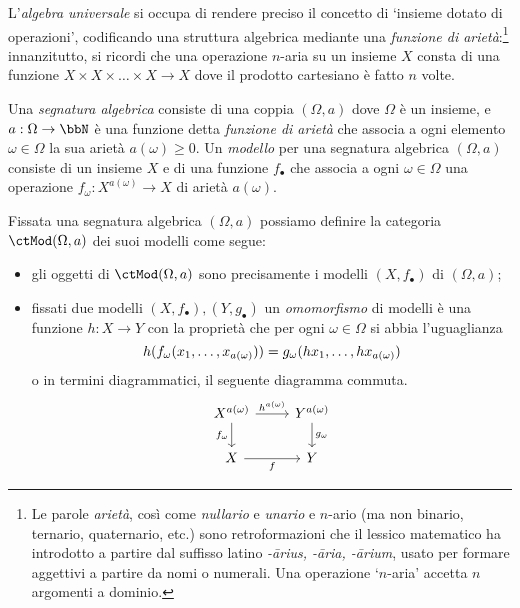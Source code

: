 L'\emph{algebra universale} si occupa di rendere preciso il concetto di `insieme dotato di operazioni', codificando una struttura algebrica mediante una \emph{funzione di arietà}:\footnote{Le parole \emph{arietà}, così come \emph{nullario} e \emph{unario} e \(n\)-ario (ma non binario, ternario, quaternario, etc.) sono retroformazioni che il lessico matematico ha introdotto a partire dal suffisso latino \emph{-\={a}rius, -\=aria, -\=arium}, usato per formare aggettivi a partire da nomi o numerali. Una operazione `\(n\)-aria' accetta \(n\) argomenti a dominio.} innanzitutto, si ricordi che una operazione \(n\)-aria su un insieme \(X\) consta di una funzione \(X\times X\times\dots\times X \to X\) dove il prodotto cartesiano è fatto \(n\) volte.
\begin{example}\label{ex_cat_sigma_strutture}
	Una \emph{segnatura algebrica} consiste di una coppia \((\Omega, a)\) dove \(\Omega\) è un insieme, e \(a : \Omega \to \bbN\) è una funzione detta \emph{funzione di arietà} che associa a ogni elemento \(\omega \in \Omega\) la sua arietà \(a(\omega)\ge 0\). Un \emph{modello} per una segnatura algebrica \((\Omega,a)\) consiste di un insieme \(X\) e di una funzione \(f_\bullet\) che associa a ogni \(\omega\in\Omega\) una operazione \(f_\omega : X^{a(\omega)} \to X\) di arietà \(a(\omega)\).

	Fissata una segnatura algebrica \((\Omega,a)\) possiamo definire la categoria \(\ctMod(\Omega,a)\) dei suoi modelli come segue:
	\begin{itemize}
		\item gli oggetti di \(\ctMod(\Omega,a)\) sono precisamente i modelli \((X,f_\bullet)\) di \((\Omega,a)\);
		\item fissati due modelli \((X,f_\bullet), (Y,g_\bullet)\) un \emph{omomorfismo} di modelli è una funzione \(h : X\to Y\) con la proprietà che per ogni \(\omega\in\Omega\) si abbia l'uguaglianza
		      \[h(f_\omega(\tup x{a(\omega)},)) = g_\omega(\tup {hx}{a(\omega)},)\]
		      o in termini diagrammatici, il seguente diagramma commuta.
		      \[
			      \begin{tikzcd}
				      X^{a(\omega)} \ar{r}{h^{a(\omega)}} \ar[d, "f_\omega"'] & Y^{a(\omega)} \ar{d}{g_\omega} \\
				      X \ar[r, "f"']& Y
			      \end{tikzcd}
		      \]
	\end{itemize}
\end{example}
